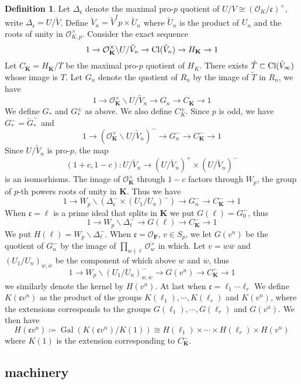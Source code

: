\documentclass[leqno]{amsart}
\newcommand{\bw}{\overline{w}}
\DeclareMathOperator{\Gal}{Gal}
\newcommand{\F}{{\mathbf{F}}} %
\newcommand{\K}{{\mathbf{K}}} %
\newcommand{\oo}{\mathcal{O}} %
\newcommand{\fc}{\mathfrak{c}}
\theoremstyle{definition}
\newtheorem{defn}[thm]{Definition}
\theoremstyle{remark}
\begin{document}
\begin{defn}
Let $\Delta_\fc$ denote
the maximal pro-$p$ quotient of 
$U/V\cong (\oo_K/\fc)^\times$,
write  $\Delta_\fc=U/\tilde{V}$.
Define $\tilde{V}_n=\tilde{V}^Ip\times \tilde{U}_n$
where $\tilde{U}_n$ is the product of $U_n$
and the roots of unity in  $\oo_{K,p}^\times$.
Consider the exact sequence
\[
	1\to \oo_\K^\times\backslash U/\tilde{V}_n
	\to \textnormal{Cl}(\tilde{V}_n)\to H_\K\to 1
\]
Let $C_\K=H_\K/T$ be the maximal pro-$p$ quotient
of $H_K$. There exists  
$ \tilde{T}\subset \textnormal{Cl}(\tilde{V}_\infty)$
whose image is $T$.
Let $G_n$ denote the quotient of  $R_n$
by the image of  $ \tilde{T}$ in $R_n$, we have
\[
	1\to \oo_\K^\times\backslash U/\tilde{V}_n
	\to G_n\to C_\K\to 1
\]
We define $G_*$ and  $G_*^{\pm}$ as above.
We also define $C_K^{\pm}$.
Since $p$ is odd, we have
$G_*^{-}=\tilde{G}_*^-$ and 
\[
	1\to (\oo_\K^\times\backslash U/\tilde{V}_n)^-
	\to G_n^-\to C_\K^-\to 1
\]
Since $U/\tilde{V}_n$ is pro-$p$, the map
\[
	 (1+c,1-c)\colon 
	 U/\tilde{V}_n\to 
	 (U/\tilde{V}_n)^+\times
	 (U/\tilde{V}_n)^-
\]
is an isomorhisms.
The image of $\oo_\K^\times$ through  $1-c$
factors through  $W_p$,
the group of $p$-th powers roots of unity in  $\K$.
Thus we have
\[
	1\to W_p\backslash (\Delta_\fc^-\times (U_1/U_n)^-)
	\to G_n^-\to C_\K^-\to 1
\]
When $\fc=\ell$ is a prime ideal that splits in  $\K$
we put  $G(\ell)=G_0^-$, thus
\[
	1\to W_p\backslash \Delta_\ell^-
	\to G(\ell)\to C_\K^-\to 1
\]
We put $H(\ell)=W_p\backslash \Delta_\ell^-$.
When  $\fc=\oo_\F$, $v\in S_p$,
we let $G(v^n)$ be the quotient 
of $G_n^-$ by the image of 
$\prod_{w\nmid \ell}\oo_w^\times$ in which.
Let $v=w\bw$ and 
$(U_1/U_n)_{w,\bw}$ be the component
of which above $w$ and  $\bw$, thus
\[
	1\to W_p\backslash (U_1/U_n)_{w,\bw}^-
	\to G(v^n)\to C_\K^-\to 1
\]
we similarly denote the kernel by $H(v^n)$.
At last
when  $\fc=\ell_1\cdots\ell_r$
We define $K(\fc v^n)$
as the product of the groups
$K(\ell_1),\cdots, K(\ell_r)$ and $K(v^n)$,
where the extensions corresponds
to the groups  $G(\ell_1),\cdots,G(\ell_r)$ and $G(v^n)$.
We then have 
\[
	H(\fc v^n)\coloneqq 
	\Gal(K(\fc v^n)/K(1))\cong 
	H(\ell_1)\times\cdots\times H(\ell_r)\times H(v^n)
\]
where $K(1)$ is the extension corresponding
to  $C_\K^-$.
\end{defn}



\subsection{machinery}
\end{document}
